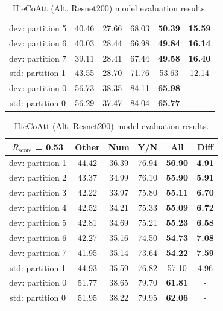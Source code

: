 \documentclass[letterpaper]{article}
\newcommand{\rscore}{}\def\rscore/{$R_{\text{score}}$}
\begin{document}
\begin{table}
\begin{subtable}{0.49\linewidth}
\begin{adjustbox}{width=0.46\columnwidth}
\begin{tabular}{c | c c c c | c}
			dev: partition 5 & 40.46 & 27.66 & 68.03 & \textbf{50.39} & \textbf{15.59} \\
			dev: partition 6 & 40.03 & 28.44 & 66.98 & \textbf{49.84} & \textbf{16.14} \\
			dev: partition 7 & 39.11 & 28.41 & 67.44 & \textbf{49.58} & \textbf{16.40} \\
			\hline
			std: partition 1 & 43.55 & 28.70 & 71.76 & 53.63          & 12.14          \\
			\hline
			dev: partition 0 & 56.73 & 38.35 & 84.11 & \textbf{65.98} & -              \\
			std: partition 0 & 56.29 & 37.47 & 84.04 & \textbf{65.77} & -              \\
			\hline
		\end{tabular}
\end{adjustbox}
		\caption{MUTAN with Attention model evaluation results.}

		\begin{adjustbox}{width=0.46\columnwidth}
\begin{tabular}{c | c c c c | c}
			\rscore/ = \textbf{0.53} & Other & Num   & Y/N   & All            & Diff          \\ [0.5ex]
			\hline
			dev: partition 1         & 44.42 & 36.39 & 76.94 & \textbf{56.90} & \textbf{4.91} \\
			dev: partition 2         & 43.37 & 34.99 & 76.10 & \textbf{55.90} & \textbf{5.91} \\
			dev: partition 3         & 42.22 & 33.97 & 75.80 & \textbf{55.11} & \textbf{6.70} \\
			dev: partition 4         & 42.52 & 34.21 & 75.33 & \textbf{55.09} & \textbf{6.72} \\
			dev: partition 5         & 42.81 & 34.69 & 75.21 & \textbf{55.23} & \textbf{6.58} \\
			dev: partition 6         & 42.27 & 35.16 & 74.50 & \textbf{54.73} & \textbf{7.08} \\
			dev: partition 7         & 41.95 & 35.14 & 73.64 & \textbf{54.22} & \textbf{7.59} \\
			\hline
			std: partition 1         & 44.93 & 35.59 & 76.82 & 57.10          & 4.96          \\
			\hline
			dev: partition 0         & 51.77 & 38.65 & 79.70 & \textbf{61.81} & -             \\
			std: partition 0         & 51.95 & 38.22 & 79.95 & \textbf{62.06} & -             \\
			\hline
		\end{tabular}
\end{adjustbox}
		\caption{HieCoAtt (Alt, Resnet200) model evaluation results.}


\end{subtable}
\end{table}
\end{document}
